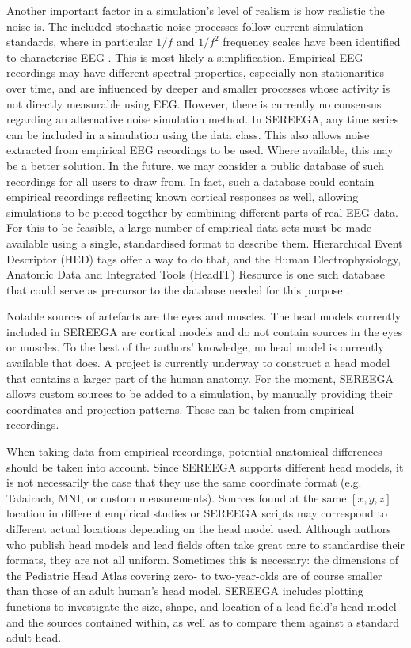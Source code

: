 Another important factor in a simulation's level of realism is how realistic the noise is. The included stochastic noise processes follow current simulation standards, where in particular $1/f$ and $1/f^2$ frequency scales have been identified to characterise EEG \cite{bedard2006freqscaling,freeman2009}. This is most likely a simplification. Empirical EEG recordings may have different spectral properties, especially non-stationarities over time, and are influenced by deeper and smaller processes whose activity is not directly measurable using EEG. However, there is currently no consensus regarding an alternative noise simulation method. In SEREEGA, any time series can be included in a simulation using the data class. This also allows noise extracted from empirical EEG recordings to be used. Where available, this may be a better solution. In the future, we may consider a public database of such recordings for all users to draw from. In fact, such a database could contain empirical recordings reflecting known cortical responses as well, allowing simulations to be pieced together by combining different parts of real EEG data. For this to be feasible, a large number of empirical data sets must be made available using a single, standardised format to describe them. Hierarchical Event Descriptor (HED) tags \cite{bigdelyshamlo2016hedtags} offer a way to do that, and the Human Electrophysiology, Anatomic Data and Integrated Tools (HeadIT) Resource is one such database that could serve as precursor to the database needed for this purpose \cite{headit}.

Notable sources of artefacts are the eyes and muscles. The head models currently included in SEREEGA are cortical models and do not contain sources in the eyes or muscles. To the best of the authors' knowledge, no head model is currently available that does. A project is currently underway to construct a head model that contains a larger part of the human anatomy. For the moment, SEREEGA allows custom sources to be added to a simulation, by manually providing their coordinates and projection patterns. These can be taken from empirical recordings.

When taking data from empirical recordings, potential anatomical differences should be taken into account. Since SEREEGA supports different head models, it is not necessarily the case that they use the same coordinate format (e.g. Talairach, MNI, or custom measurements). Sources found at the same $[x,y,z]$ location in different empirical studies or SEREEGA scripts may correspond to different actual locations depending on the head model used. Although authors who publish head models and lead fields often take great care to standardise their formats, they are not all uniform. Sometimes this is necessary: the dimensions of the Pediatric Head Atlas covering zero- to two-year-olds are of course smaller than those of an adult human's head model. SEREEGA includes plotting functions to investigate the size, shape, and location of a lead field's head model and the sources contained within, as well as to compare them against a standard adult head.


